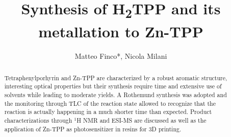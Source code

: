 \documentclass[num-refs]{wiley-article}
\title{Synthesis of \texorpdfstring{H\textsubscript{2}}-TPP and its metallation to Zn-TPP}
\author[1\authfn{1}]{Matteo Finco*, Nicola Milani}
\affil[1]{DiSC, Università degli Studi di Padova, Padova, Italy, 35131, Italy}
\begin{document}
\begin{frontmatter}
\maketitle

\begin{abstract}
    Tetraphenylporhyrin and Zn-TPP are characterized by a robust aromatic structure, interesting optical properties but their synthesis require time and extensive use of solvents while leading to moderate yields.
    A Rothemund synthesis was adopted and the monitoring through TLC of the reaction state allowed to recognize that the reaction is actually happening in a much shorter time than expected.
    Product characterizations through $^{1}$H NMR and ESI-MS are discussed as well as the application of Zn-TPP as photosensitizer in resins for 3D printing.

\end{abstract}

\end{frontmatter}
\end{document}

